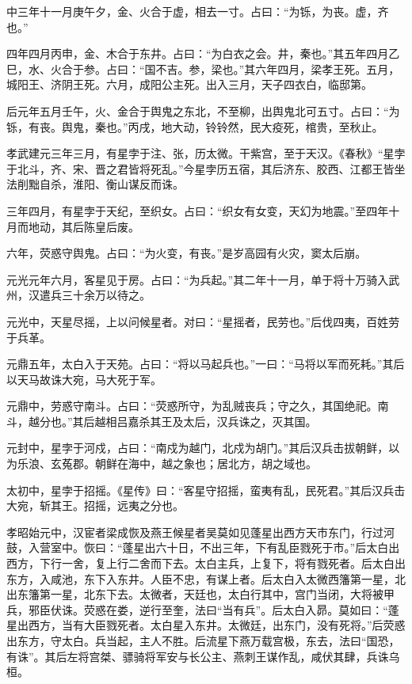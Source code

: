 \documentclass[]{article}
\begin{document}
中三年十一月庚午夕，金、火合于虚，相去一寸。占曰：``为铄，为丧。虚，齐也。''

四年四月丙申，金、木合于东井。占曰：``为白衣之会。井，秦也。''其五年四月乙巳，水、火合于参。占曰：``国不吉。参，梁也。''其六年四月，梁孝王死。五月，城阳王、济阴王死。六月，成阳公主死。出入三月，天子四衣白，临邸第。

后元年五月壬午，火、金合于舆鬼之东北，不至柳，出舆鬼北可五寸。占曰：``为铄，有丧。舆鬼，秦也。''丙戌，地大动，铃铃然，民大疫死，棺贵，至秋止。

孝武建元三年三月，有星孛于注、张，历太微。干紫宫，至于天汉。《春秋》``星孛于北斗，齐、宋、晋之君皆将死乱。''今星孛历五宿，其后济东、胶西、江都王皆坐法削黜自杀，淮阳、衡山谋反而诛。

三年四月，有星孛于天纪，至织女。占曰：``织女有女变，天幻为地震。''至四年十月而地动，其后陈皇后废。

六年，荧惑守舆鬼。占曰：``为火变，有丧。''是岁高园有火灾，窦太后崩。

元光元年六月，客星见于房。占曰：``为兵起。''其二年十一月，单于将十万骑入武州，汉遣兵三十余万以待之。

元光中，天星尽摇，上以问候星者。对曰：``星摇者，民劳也。''后伐四夷，百姓劳于兵革。

元鼎五年，太白入于天苑。占曰：``将以马起兵也。''一曰：``马将以军而死耗。''其后以天马故诛大宛，马大死于军。

元鼎中，劳惑守南斗。占曰：``荧惑所守，为乱贼丧兵；守之久，其国绝祀。南斗，越分也。''其后越相吕嘉杀其王及太后，汉兵诛之，灭其国。

元封中，星孛于河戍，占曰：``南戍为越门，北戍为胡门。''其后汉兵击拔朝鲜，以为乐浪、玄菟郡。朝鲜在海中，越之象也；居北方，胡之域也。

太初中，星孛于招摇。《星传》曰：``客星守招摇，蛮夷有乱，民死君。''其后汉兵击大宛，斩其王。招摇，远夷之分也。

孝昭始元中，汉宦者梁成恢及燕王候星者吴莫如见蓬星出西方天市东门，行过河鼓，入营室中。恢曰：``蓬星出六十日，不出三年，下有乱臣戮死于市。''后太白出西方，下行一舍，复上行二舍而下去。太白主兵，上复下，将有戮死者。后太白出东方，入咸池，东下入东井。人臣不忠，有谋上者。后太白入太微西籓第一星，北出东籓第一星，北东下去。太微者，天廷也，太白行其中，宫门当闭，大将被甲兵，邪臣伏诛。荧惑在娄，逆行至奎，法曰``当有兵''。后太白入昴。莫如曰：``蓬星出西方，当有大臣戮死者。太白星入东井。太微廷，出东门，没有死将。''后荧惑出东方，守太白。兵当起，主人不胜。后流星下燕万载宫极，东去，法曰``国恐，有诛''。其后左将宫桀、骠骑将军安与长公主、燕刺王谋作乱，咸伏其肆，兵诛乌桓。
\end{document}

